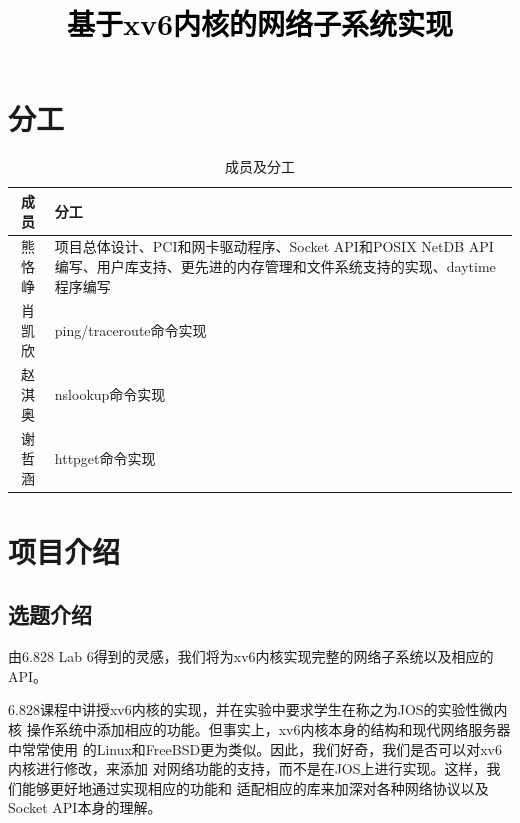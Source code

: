 \documentclass[a4paper,twoside]{ctexrep}
\newcommand{\PaperTitle}{基于xv6内核的网络子系统实现}  %
\begin{document}
\newpage

\title{
	\Large{\textcolor{black}{\PaperTitle}}
}
	
	
\tableofcontents

 
\newpage
\setcounter{page}{1}

\begin{spacing}{1.2}

\chapter{分工}

\begin{table}[h]
	\centering
	\caption{成员及分工}
	\label{tbl:work}
	\renewcommand\arraystretch{1.5}
	\begin{tabular}{|c|p{}|}
		\toprule
		\hline
		成员 & 分工 \\
		\hline
		熊恪峥 & 项目总体设计、PCI和网卡驱动程序、Socket API和POSIX NetDB API编写、用户库支持、更先进的内存管理和文件系统支持的实现、daytime程序编写\\
		\hline
		肖凯欣 & ping/traceroute命令实现 \\
		\hline
		赵淇奥 & nslookup命令实现 \\
		\hline
		谢哲涵 & httpget命令实现 \\
		\hline
		\bottomrule
	\end{tabular}

\end{table}

\chapter{项目介绍}

\section{选题介绍}

由6.828 Lab 6\cite{kaashoek20066}得到的灵感，我们将为xv6内核实现完整的网络子系统以及相应的API。

6.828课程中讲授xv6内核\cite{cox2011xv6}的实现，并在实验中要求学生在称之为JOS的实验性微内核
操作系统中添加相应的功能。但事实上，xv6内核本身的结构和现代网络服务器中常常使用
的Linux和FreeBSD更为类似。因此，我们好奇，我们是否可以对xv6内核进行修改，来添加
对网络功能的支持，而不是在JOS上进行实现。这样，我们能够更好地通过实现相应的功能和
适配相应的库来加深对各种网络协议以及Socket API本身的理解。



\end{spacing}
\end{document}

